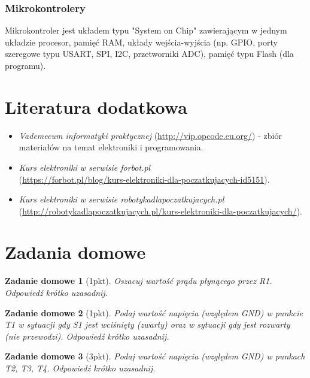 \documentclass{pdfBooklets}
\begin{document}
\subsubsection{Mikrokontrolery}

Mikrokontroler jest układem typu "System on Chip" zawierającym w jednym układzie procesor, pamięć RAM, układy wejścia-wyjścia (np. GPIO, porty szeregowe typu USART, SPI, I2C, przetworniki ADC), pamięć typu Flash (dla programu).


\section{Literatura dodatkowa}

\begin{itemize}
\item \emph{Vademecum informatyki praktycznej} (\url{http://vip.opcode.eu.org/}) - zbiór materiałów na temat elektroniki i programowania.
\item \emph{Kurs elektroniki w serwisie \emph{forbot.pl}}\\ (\url{https://forbot.pl/blog/kurs-elektroniki-dla-poczatkujacych-id5151}).
\item \emph{Kurs elektroniki w serwisie \emph{robotykadlapoczatkujacych.pl}}\\ (\url{http://robotykadlapoczatkujacych.pl/kurs-elektroniki-dla-poczatkujacych/}).
\end{itemize}

\clearpage
\section{Zadania domowe}
\newtheorem{ZadanieDomowe}{Zadanie domowe}

\begin{ZadanieDomowe} [1pkt]
Oszacuj wartość prądu płynącego przez R1. Odpowiedź krótko uzasadnij.
\end{ZadanieDomowe}

\begin{ZadanieDomowe} [1pkt]
Podaj wartość napięcia (względem GND) w punkcie T1 w sytuacji gdy S1 jest wciśnięty (zwarty) oraz w sytuacji gdy jest rozwarty (nie przewodzi). Odpowiedź krótko uzasadnij.
\end{ZadanieDomowe}

\begin{ZadanieDomowe} [3pkt]
Podaj wartość napięcia (względem GND) w punkach T2, T3, T4. Odpowiedź krótko uzasadnij.
\end{ZadanieDomowe}
\end{document}
